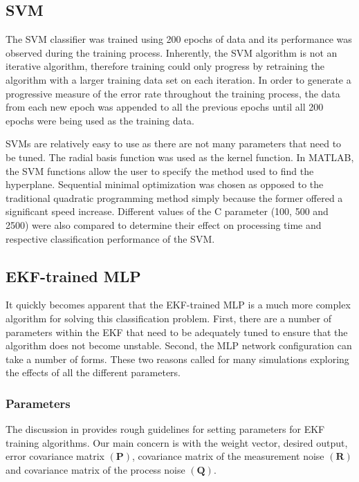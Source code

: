 \documentclass[11pt,letterpaper,titlepage]{article}
\numberwithin{equation}{section}
\numberwithin{figure}{section}
\numberwithin{table}{section}
\begin{document}
\subsection{SVM}
\label{sec:svm-1}

The SVM classifier was trained using 200 epochs of data and its performance was observed during the training process. Inherently, the SVM algorithm is not an iterative algorithm, therefore training could only progress by retraining the algorithm with a larger training data set on each iteration. In order to generate a progressive measure of the error rate throughout the training process, the data from each new epoch was appended to all the previous epochs until all 200 epochs were being used as the training data. 

SVMs are relatively easy to use as there are not many parameters that need to be tuned. The radial basis function was used as the kernel function. In MATLAB, the SVM functions allow the user to specify the method used to find the hyperplane. Sequential minimal optimization was chosen as opposed to the traditional quadratic programming method simply because the former offered a significant speed increase. Different values of the C parameter (100, 500 and 2500) were also compared to determine their effect on processing time and respective classification performance of the SVM.

\subsection{EKF-trained MLP}
\label{sec:ekf-trained-mlp-1}

It quickly becomes apparent that the EKF-trained MLP is a much more complex algorithm for solving this classification problem. First, there are a number of parameters within the EKF that need to be adequately tuned to ensure that the algorithm does not become unstable. Second, the MLP network configuration can take a number of forms. These two reasons called for many simulations exploring the effects of all the different parameters. 

\subsubsection{Parameters}
\label{sec:parameters}

The discussion in \cite{Haykin2001} provides rough guidelines for setting parameters for EKF training algorithms. Our main concern is with the weight vector, desired output, error covariance matrix \(\left(\mathbf{P}\right)\), covariance matrix of the measurement noise \(\left(\mathbf{R}\right)\) and covariance matrix of the process noise \(\left(\mathbf{Q}\right)\).
\end{document}
